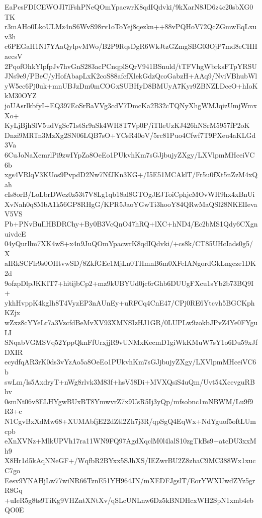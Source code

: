 EaPcsFDICEWOJI7lFshPNeQOmYpacwrK8qdIQdvki/9kXarN8JD6z4c20sbXG0TK
r3mAHo0LkoULMz4nS6WvS98rv1oToYej8qezkn++88vPQHoV72QcZGmwEqLxuv3h
c6PEGaH1NI7YAaQylpvMWo/B2P9RqsDgR6WkJtzGZmgSBG03OjP7md8eCHHaecsV
2PqofOhkYlpfpJv7hvGnS283acPCnqplSQrV941BSnuld/tTFVhgWbrksFTpYRSU
JNs9e9/PBeC/yHofAbapLxK2coS88afcfXlekGdzQcoGabzH+AAq9/NviVBhubWl
yW5ec6Pj0uk+mnUBJzDm0mCOGxSUBHyD8BMUyA7Kyr9ZBNZLDceO+hIoKkM30OYZ
joUAsrlkbfyI+EQ397EoSrBaVVg3cdV7DmcKa2B32cTQNyXhgWMJqizUmjWmxXo+
KyLjBjhSlV5udVgSc71stSr9aSk4WH8T7Vp0P/iTlleUzKJ426hNSrM5957fP2oK
Dnzi9MRTn3MzXg2SN06LQB7sO+YCsR40oV/5rc81Puo4Cfwf7T9PXeu4aKLGd3Va
6CuJoNaXemrlPi9zwIYpZa8OeEo1PUkvhKm7sGJjbujyZXgy/LXVlpmMHceiVC6b
xgs4VRlqV3KUos9PvpdD2Nw7NfJKn3KG+/I5E51MCAklT/Fr5u0fXt5nZzM4xQah
cIs8orB/LoLbrDWez0z53t7V8Lg1qb18al8GTOgJEJToiCphjeMOvWH9hx4xBnUi
XvNah0q8MbA1k56GP8RHgG/KPR5JaoYGwTi3hooY84QRwMaQSl28NKElIevaV5VS
Pb+PNvBuIlHBDRChy+By0B3VcQnO47hRQ+lXC+hND4/Ec2bMS1Qdy6CXgnuivdcE
04yQurllm7XK4wS+x4n9JuQOmYpacwrK8qdIQdvki/+cs8k/CT85UHcIads0g5/X
aIRkSCFlr9s0OHtvwSD/8ZkfGEe1MjLn0THmnB6m0XFeIANgordGkLngeze1DK2d
9ofzpDlpJKKIT7+hitijbCp2+mz9kUBYUd0jc6rGhb6DUUgFXcu1sYb2b73BQ9I+
ykhHvppK4kgIh8T4VyzEP3nAUnEy+uRFCq4CnE47/CPj0RE6Ytcvh5BGCKphKZjx
wZxz8cYYeLr7a3VzcfdBeMvXV93XMNSIzHJ1GR/0LUPLw9zokbJPvZ4Ye0FYguLI
SNqabVGMSVq52YppQknFfUrxjjR9vUNMxKecmD1giWkKMuW7sY1o6Du59xJfDXIR
ecydfqAR3rK0ds3vYzAo5a8OeEo1PUkvhKm7sGJjbujyZXgy/LXVlpmMHceiVC6b
swLm/ls5AxdryT+nWg8rlvk3M83f+hsV58Di+MVXQsiS4uQm/Uvt54XcevguRBhv
0smNt06v8ELHYgwBUxBT8YmwvrZ7x9UsR5Ij3yQp/mfsobnc1mNBWM/Lu9f9R3+c
N1CgvBxXdMw68+XUMAbfjE22dZtl2Zh7j3R/qpSgQ4EqWx+NdYguof5oftLUmcpb
eXnXVNz+MlkUPVh17ra11WN9FQ97AgdXqclM0l4lalS10zgTkBs9+atcDU3xxMh9
X8Hr1d5kAqNNeGF+/WqfbR2BYxx5SJhXS/IEZwrBU2Z8zbaC9MC388Wx1xucC7go
Eesv9YNAHjLw77wiNR66TznE51YH964JN/mXEDFJgslT/EorYWXUwdZYz5grR8Gq
+uIeR5g8ts9TiKg9VHZntXNtXv/qSLcUNLnw6Dz5kBNDHcxWH2SpN1xmb4ebQO0E
